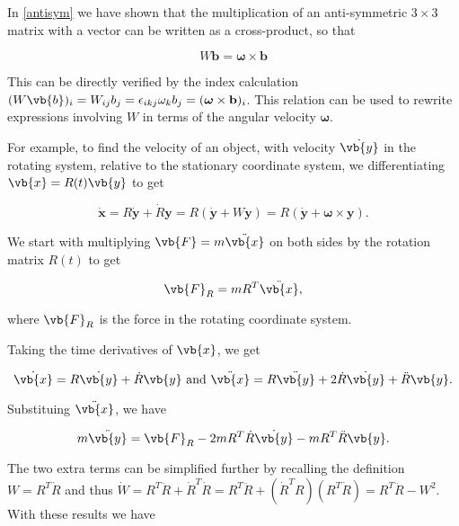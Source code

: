 \documentclass[a4paper,12pt]{report}
\begin{document}
In \cref{antisym} we have shown that the multiplication of an anti-symmetric \(3 \times 3\) matrix with a vector can be written as a cross-product, so that

\begin{equation}
W \mathbf{b} = \boldsymbol{\omega} \times \mathbf{b}
\end{equation}

This can be directly verified by the index calculation \( (W\vb{b})_{i} = W_{ij} b_j = \epsilon_{ikj} \omega_k b_j = (\boldsymbol{\omega} \times \mathbf{b})_i \). This relation can be used to rewrite expressions involving \( W \) in terms of the angular velocity \(\boldsymbol{\omega}\).

For example, to find the velocity of an object, with velocity \(\dot{\vb{y} } \) in the rotating system, relative to the stationary coordinate system, we differentiating \(\vb{x} = R(t)\vb{y} \) to get

\begin{equation}
\dot{\mathbf{x}} = R \dot{\mathbf{y}} + \dot{R} \mathbf{y} = R (\dot{\mathbf{y}} + W \mathbf{y}) = R (\dot{\mathbf{y}} + \boldsymbol{\omega} \times \mathbf{y}) .
\end{equation}

We start with multiplying \(\vb{F} = m \ddot{\vb{x} } \) on both sides by the rotation matrix \(R(t)\) to get

\begin{equation}
    \vb{F} _{R} = mR^{T}\ddot{\vb{x} },   
\end{equation}

where \(\vb{F} _{R} \) is the force in the rotating coordinate system.

Taking the time derivatives of \(\vb{x} \), we get 

\begin{equation}
    \dot{\vb{x} } = R \dot{\vb{y} } + \dot{R} \vb{y} \text { and } \ddot{\vb{x} } = R \ddot{\vb{y} } + 2\dot{R} \dot{\vb{y} } + \ddot{R} \vb{y} .   
\end{equation}

Substituing \(\ddot{\vb{x} } \), we have

\begin{equation}
    m \ddot{\vb{y} } = \vb{F} _{R} - 2mR^{T}\dot{R} \dot{\vb{y} } - mR^{T} \ddot{R} \vb{y} .      
\end{equation}

The two extra terms can be simplified further by recalling the definition \(W = R^{T}\dot{R}  \) and thus \(\dot{W} = R^{T} \ddot{R} + \dot{R} ^{T} \dot{R} = R^{T}\ddot{R} + (\dot{R} ^{T}R )(R^{T}\dot{R}  ) = R^{T}\ddot{R} - W^2      \). With these results we have
\end{document}
